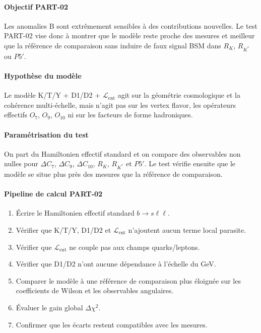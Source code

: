 \documentclass[11pt,a4paper]{article}
\newcommand{\Lent}{\mathcal{L}_{\mathrm{ent}}}
\begin{document}
\paragraph{Objectif PART-02}
Les anomalies B sont extrêmement sensibles à des contributions nouvelles. Le test PART-02 vise donc à montrer que le modèle reste proche des mesures et meilleur que la référence de comparaison sans induire de faux signal BSM dans $R_K$, $R_{K^*}$ ou $P5'$.

\paragraph{Hypothèse du modèle}
Le modèle K/T/Y + D1/D2 + $\Lent$ agit sur la géométrie cosmologique et la cohérence multi-échelle, mais n'agit pas sur les vertex flavor, les opérateurs effectifs $O_7$, $O_9$, $O_{10}$ ni sur les facteurs de forme hadroniques.

\paragraph{Paramétrisation du test}
On part du Hamiltonien effectif standard et on compare des observables non nulles pour $\Delta C_7$, $\Delta C_9$, $\Delta C_{10}$, $R_K$, $R_{K^*}$ et $P5'$. Le test vérifie ensuite que le modèle se situe plus près des mesures que la référence de comparaison.

\paragraph{Pipeline de calcul PART-02}
\begin{enumerate}[leftmargin=*,itemsep=0.2em,topsep=0.2em]
\item Écrire le Hamiltonien effectif standard $b\to s\ell\ell$.
\item Vérifier que K/T/Y, D1/D2 et $\Lent$ n'ajoutent aucun terme local parasite.
\item Vérifier que $\Lent$ ne couple pas aux champs quarks/leptons.
\item Vérifier que D1/D2 n'ont aucune dépendance à l'échelle du GeV.
\item Comparer le modèle à une référence de comparaison plus éloignée sur les coefficients de Wilson et les observables angulaires.
\item Évaluer le gain global $\Delta\chi^2$.
\item Confirmer que les écarts restent compatibles avec les mesures.
\end{enumerate}
\end{document}
